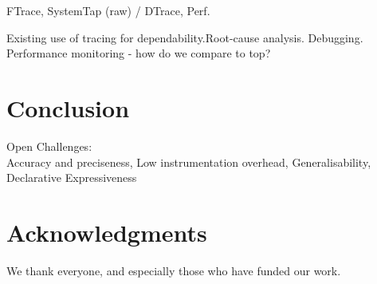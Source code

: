 \documentclass[letterpaper,twocolumn,10pt]{article}
\begin{document}
FTrace, SystemTap (raw) / DTrace, Perf.

Existing use of tracing for dependability.\newline Root-cause analysis.
Debugging. Performance monitoring - how do we compare to top?

\section{Conclusion} Open Challenges:\\ Accuracy and preciseness, Low
instrumentation overhead, Generalisability, Declarative Expressiveness

\section{Acknowledgments}

We thank everyone, and especially those who have funded our work.

{\footnotesize  }
\end{document}
